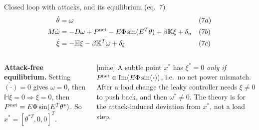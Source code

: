 \documentclass[aspectratio=169,9pt]{beamer}
\newcommand{\bbK}{\mathbb{K}}
\newcommand{\bbH}{\mathbb{H}}
\begin{document}
\begin{frame}[t]{Closed loop with attacks, and its equilibrium (eq.~7)}
\footnotesize
\begin{align*}
\dot\theta&=\omega &&(7a)\\
M\dot\omega&=-D\omega+P^{\rm net}-E\Phi\sin(E^T\theta)+\beta\bbK\xi+\delta_u &&(7b)\\
\dot\xi&=-\bbH\xi-\beta\bbK^T\omega+\delta_\xi &&(7c)
\end{align*}
\begin{columns}[T]
\textbf{Attack-free equilibrium.} Setting $\dot{(\cdot)}=0$ gives $\omega=0$, then $\bbH\xi=0\Rightarrow\xi=0$, then $P^{\rm net}=E\Phi\sin(E^T\theta^*)$. So $x^*=[\theta^{*T},0,0]^T$.
\begin{alertblock}{[mine] A subtle point}
$x^*$ has $\xi^*=0$ \emph{only if} $P^{\rm net}\in\mathrm{Im}(E\Phi\sin(\cdot))$, i.e.\ no net power mismatch. After a load change the leaky controller needs $\xi\neq0$ to push back, and then $\omega^*\neq0$. The theory is for the attack-induced deviation from $x^*$, not a load step.
\end{alertblock}
\end{columns}
\end{frame}
\end{document}
